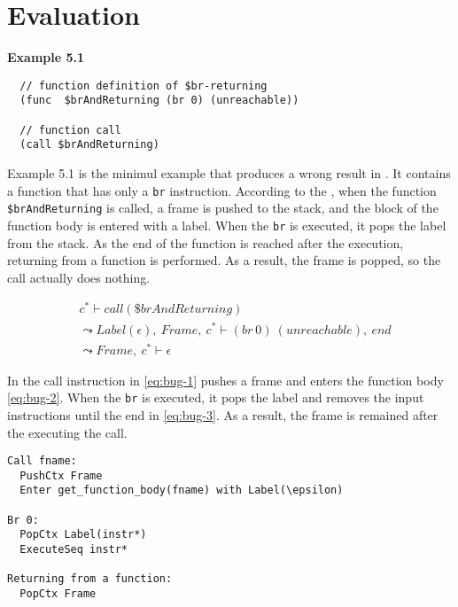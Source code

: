 
\chapter{Evaluation}
\label{ch:eval}
\noindent


\textbf{Example 5.1}
\begin{verbatim}
  // function definition of $br-returning
  (func  $brAndReturning (br 0) (unreachable))

  // function call
  (call $brAndReturning)
\end{verbatim}

Example 5.1 is the minimul example that produces a wrong result in \spectecp{}.
It contains a function that has only a \texttt{br} instruction.
According to the \officialp{}, when the function \texttt{\$brAndReturning} is
called, a frame is pushed to the stack, and the block of the function
body is entered with a label.
When the \texttt{br} is executed, it pops the label from the stack.
As the end of the function is reached after the execution, returning from a
function is performed.
As a result, the frame is popped, so the call actually does nothing.


\begin{align}
  &c^* \vdash call(\$brAndReturning) \label{eq:bug-1} \\
&\leadsto
  Label(\epsilon), ~ Frame, ~ c^* \vdash (br ~ 0) ~ (unreachable), ~ end \label{eq:bug-2} \\
&\leadsto
  Frame, ~ c^* \vdash \epsilon \label{eq:bug-3}
\end{align}

In \spectecp{} the call instruction in \cref{eq:bug-1} pushes a frame and
enters the function body \cref{eq:bug-2}.
When the \texttt{br} is executed, it pops the label and removes the input
instructions until the end in \cref{eq:bug-3}.
As a result, the frame is remained after the executing the call.


\begin{verbatim}
Call fname:
  PushCtx Frame
  Enter get_function_body(fname) with Label(\epsilon)

Br 0:
  PopCtx Label(instr*)
  ExecuteSeq instr*

Returning from a function:
  PopCtx Frame
\end{verbatim}


